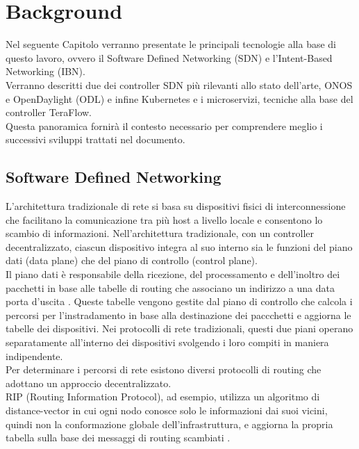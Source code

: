 \chapter{Background}
\label{cap:contesto}
Nel seguente Capitolo verranno presentate le principali tecnologie alla base di questo lavoro, ovvero il Software Defined Networking (SDN) e l'Intent-Based Networking (IBN). 
\\Verranno descritti due dei controller SDN più rilevanti allo stato dell'arte, ONOS \cite{ONOS} e OpenDaylight (ODL) \cite{ODL} e infine Kubernetes e i microservizi, tecniche alla base del controller TeraFlow.
\\Questa panoramica fornirà il contesto necessario per comprendere meglio i successivi sviluppi trattati nel documento.
\section{Software Defined Networking}
L'architettura tradizionale di rete si basa su dispositivi fisici di interconnessione che facilitano la comunicazione tra più host a livello locale e consentono lo scambio di informazioni.
Nell'architettura tradizionale, con un controller decentralizzato, ciascun dispositivo integra al suo interno sia le funzioni del piano dati (data plane) che del piano di controllo (control plane). 
\\Il piano dati è responsabile della ricezione, del processamento e dell'inoltro dei pacchetti in base alle tabelle di routing che associano un indirizzo a una data porta d'uscita \cite{tesiSDN:2020}. 
Queste tabelle vengono gestite dal piano di controllo che calcola i percorsi 
per l'instradamento in base alla destinazione dei paccchetti e aggiorna le tabelle dei dispositivi. 
Nei protocolli di rete tradizionali, questi due piani operano separatamente all'interno dei dispositivi svolgendo i loro compiti in maniera indipendente. 
\\Per determinare i percorsi di rete esistono diversi protocolli di routing che adottano un approccio decentralizzato.
\\RIP (Routing Information Protocol), ad esempio, utilizza un algoritmo di distance-vector in cui ogni nodo conosce solo le informazioni dai suoi vicini, quindi non la conformazione globale dell'infrastruttura, e aggiorna la propria tabella sulla base dei messaggi di routing scambiati \cite{rip}.
